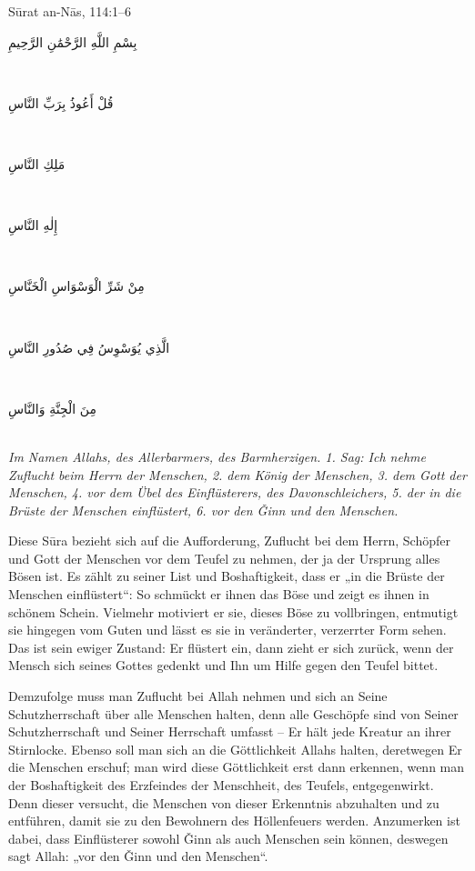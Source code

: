 \begin{quranvers}{Sūrat an-Nās, 114:1--6}
{\quranfont\begin{Arabic}
بِسْمِ اللَّهِ الرَّحْمَٰنِ الرَّحِيمِ
\end{Arabic}}\\[2mm]
{\quranfont\begin{Arabic}
قُلْ أَعُوذُ بِرَبِّ النَّاسِ
\end{Arabic}}\\[2mm]
{\quranfont\begin{Arabic}
مَلِكِ النَّاسِ
\end{Arabic}}\\[2mm]
{\quranfont\begin{Arabic}
إِلٰهِ النَّاسِ
\end{Arabic}}\\[2mm]
{\quranfont\begin{Arabic}
مِنْ شَرِّ الْوَسْوَاسِ الْخَنَّاسِ
\end{Arabic}}\\[2mm]
{\quranfont\begin{Arabic}
الَّذِي يُوَسْوِسُ فِي صُدُورِ النَّاسِ
\end{Arabic}}\\[2mm]
{\quranfont\begin{Arabic}
مِنَ الْجِنَّةِ وَالنَّاسِ
\end{Arabic}}\\[3mm]
\emph{Im Namen Allahs, des Allerbarmers, des Barmherzigen. 1. Sag: Ich nehme Zuflucht beim
Herrn der Menschen, 2. dem König der Menschen, 3. dem Gott der Menschen, 4. vor dem Übel
des Einflüsterers, des Davonschleichers, 5. der in die Brüste der Menschen einflüstert, 6. vor
den Ǧinn und den Menschen.}
\end{quranvers}

Diese Sūra bezieht sich auf die Aufforderung, Zuflucht bei dem Herrn, Schöpfer und Gott der
Menschen vor dem Teufel zu nehmen, der ja der Ursprung alles Bösen ist. Es zählt zu seiner List
und Boshaftigkeit, dass er „in die Brüste der Menschen einflüstert“: So schmückt er ihnen das
Böse und zeigt es ihnen in schönem Schein. Vielmehr motiviert er sie, dieses Böse zu vollbringen,
entmutigt sie hingegen vom Guten und lässt es sie in veränderter, verzerrter Form sehen. Das ist
sein ewiger Zustand: Er flüstert ein, dann zieht er sich zurück, wenn der Mensch sich seines
Gottes gedenkt und Ihn um Hilfe gegen den Teufel bittet.

Demzufolge muss man Zuflucht bei Allah nehmen und sich an Seine Schutzherrschaft über alle
Menschen halten, denn alle Geschöpfe sind von Seiner Schutzherrschaft und Seiner Herrschaft
umfasst – Er hält jede Kreatur an ihrer Stirnlocke. Ebenso soll man sich an die Göttlichkeit Allahs
halten, deretwegen Er die Menschen erschuf; man wird diese Göttlichkeit erst dann erkennen,
wenn man der Boshaftigkeit des Erzfeindes der Menschheit, des Teufels, entgegenwirkt. Denn
dieser versucht, die Menschen von dieser Erkenntnis abzuhalten und zu entführen, damit sie zu
den Bewohnern des Höllenfeuers werden. Anzumerken ist dabei, dass Einflüsterer sowohl Ǧinn
als auch Menschen sein können, deswegen sagt Allah: „vor den Ǧinn und den Menschen“.

